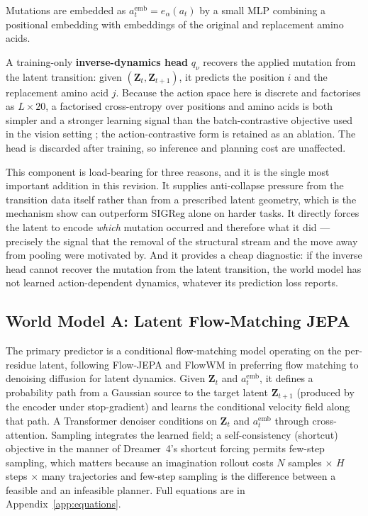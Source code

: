 \documentclass[12pt, a4paper]{article}
\begin{document}
Mutations are embedded as $a_t^{\text{emb}} = e_\alpha(a_t)$ by a small MLP combining a positional embedding with embeddings of the original and replacement amino acids.

A training-only \textbf{inverse-dynamics head} $q_\nu$ recovers the applied mutation from the latent transition: given $(\mathbf{Z}_t, \mathbf{Z}_{t+1})$, it predicts the position $i$ and the replacement amino acid $j$. Because the action space here is discrete and factorises as $L \times 20$, a factorised cross-entropy over positions and amino acids is both simpler and a stronger learning signal than the batch-contrastive objective used in the vision setting \citep{boylan2026nogaussian}; the action-contrastive form is retained as an ablation. The head is discarded after training, so inference and planning cost are unaffected.

This component is load-bearing for three reasons, and it is the single most important addition in this revision. It supplies anti-collapse pressure from the transition data itself rather than from a prescribed latent geometry, which is the mechanism \citet{boylan2026nogaussian} show can outperform SIGReg alone on harder tasks. It directly forces the latent to encode \textit{which} mutation occurred and therefore what it did --- precisely the signal that the removal of the structural stream and the move away from pooling were motivated by. And it provides a cheap diagnostic: if the inverse head cannot recover the mutation from the latent transition, the world model has not learned action-dependent dynamics, whatever its prediction loss reports.

\subsection{World Model A: Latent Flow-Matching JEPA}
\label{sec:archA}

The primary predictor is a conditional flow-matching model \citep{lipman2023flowmatching} operating on the per-residue latent, following Flow-JEPA \citep{huo2026flowjepa} and FlowWM \citep{porcher2026flowwm} in preferring flow matching to denoising diffusion for latent dynamics. Given $\mathbf{Z}_t$ and $a_t^{\text{emb}}$, it defines a probability path from a Gaussian source to the target latent $\mathbf{Z}_{t+1}$ (produced by the encoder under stop-gradient) and learns the conditional velocity field along that path. A Transformer denoiser conditions on $\mathbf{Z}_t$ and $a_t^{\text{emb}}$ through cross-attention. Sampling integrates the learned field; a self-consistency (shortcut) objective in the manner of Dreamer~4's shortcut forcing \citep{hafner2025dreamer4} permits few-step sampling, which matters because an imagination rollout costs $N$ samples $\times$ $H$ steps $\times$ many trajectories and few-step sampling is the difference between a feasible and an infeasible planner. Full equations are in Appendix~\ref{app:equations}.
\end{document}

